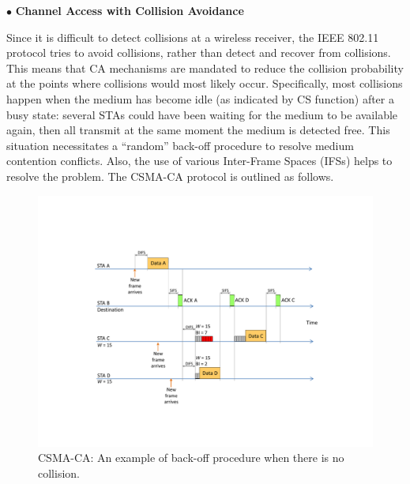 \documentclass[12pt,onecolumn]{article}
\begin{document}
\vspace{3mm}
\noindent $\bullet$ \textbf{Channel Access with Collision Avoidance}
\vspace{3mm}

\noindent Since it is difficult to detect collisions at a wireless receiver, the IEEE 802.11 protocol tries to avoid collisions, rather than detect and recover from collisions. This means that CA mechanisms are mandated to reduce the collision probability at the points where collisions would most likely occur. Specifically, most collisions happen when the medium has become idle (as indicated by CS function) after a busy state: several STAs could have been waiting for the medium to be available again, then all transmit at the same moment the medium is detected free. This situation necessitates a ``random'' back-off procedure to resolve medium contention conflicts. Also, the use of various Inter-Frame Spaces (IFSs) helps to resolve the problem. The CSMA-CA protocol is outlined as follows.

\begin{figure}[!t]
\centering
\includegraphics[width=0.9\columnwidth]{figures2/CSMA-CA-back-off-no-collision}
\caption{CSMA-CA: An example of back-off procedure when there is no collision.}
\label{figs:CSMA-CA-back-off-no-collision}
\end{figure}
\end{document}
